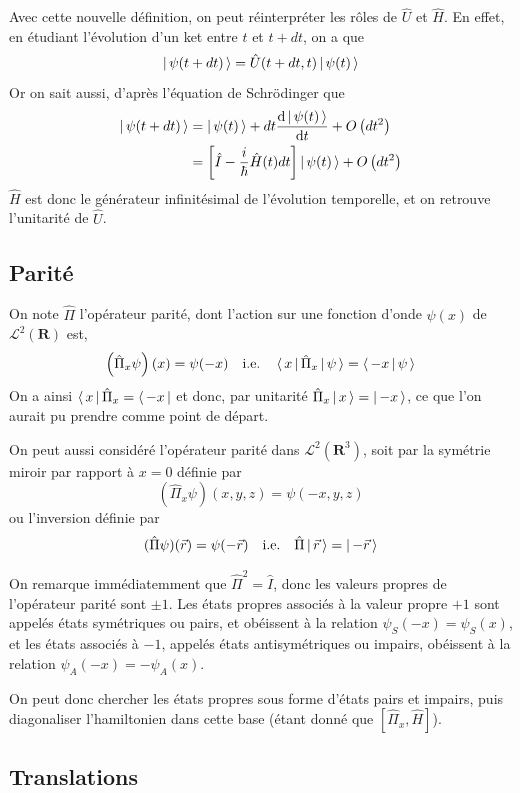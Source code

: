     Avec cette nouvelle définition, on peut réinterpréter les rôles de $\hat{U}$ et $\hat{H}$. En effet, en étudiant l’évolution d’un ket entre $t$ et $t + dt$, on a que 
    \[ \left| \, \psi(t + dt) \, \right> = \hat{U}(t + dt, t) \left| \, \psi(t) \, \right> \]   
    Or on sait aussi, d’après l’équation de Schrödinger que 
    \begin{align*}
        \left| \, \psi(t + dt) \, \right>
        &= \left| \, \psi(t) \, \right> + dt \frac{\text{d}\left| \, \psi(t) \, \right> }{\text{d}t}  + O\left(dt^2\right) \\
        &= \left[\hat{I} - \frac{i}{\hbar} \hat{H}(t) dt\right] \left| \, \psi(t) \, \right> + O\left(dt^2\right)
    \end{align*} 
    $\hat{H}$ est donc le générateur infinitésimal de l’évolution temporelle, et on retrouve l’unitarité de $\hat{U}$.

    \subsection{Parité}

    On note $\hat{\Pi}$ l’opérateur parité, dont l’action sur une fonction d’onde $\psi(x)$ de $\mathcal{L}^2(\mathbf{R})$ est,
    \[ \left(\hat{\Pi}_x\psi\right)(x) = \psi(-x) \quad \text{i.e.} \quad \left< \, x \, \right| \hat{\Pi}_x \left| \, \psi \, \right> = \left< \, -x \, \middle| \, \psi \, \right> \]
    On a ainsi $\left< \, x \, \right| \hat{\Pi}_x = \left< \, -x \, \right|$ et donc, par unitarité $\hat{\Pi}_x \left| \, x \, \right> = \left| \, -x \, \right>$, ce que l’on aurait pu prendre comme point de départ.

    On peut aussi considéré l’opérateur parité dans $\mathcal{L}^2(\mathbf{R}^3)$, soit par la symétrie miroir par rapport à $x = 0$ définie par 
    \[ (\hat{\Pi}_x\psi)(x,y,z) = \psi(-x,y,z) \]    
    ou l’inversion définie par 
    \[ (\hat{\Pi}\psi)(\vec{r}) = \psi(-\vec{r}) \quad \text{i.e.} \quad \hat{\Pi}\left| \, \vec{r} \, \right> = \left| \, -\vec{r} \, \right> \] 

    On remarque immédiatemment que $\hat{\Pi}^2 = \hat{I}$, donc les valeurs propres de l’opérateur parité sont $\pm 1$. Les états propres associés à la valeur propre $+1$ sont appelés états symétriques ou pairs, et obéissent à la relation $\psi_S(-x) = \psi_S(x)$, et les états associés à $-1$, appelés états antisymétriques ou impairs, obéissent à la relation $\psi_A(-x) = - \psi_A(x)$.

    On peut donc chercher les états propres sous forme d’états pairs et impairs, puis diagonaliser l’hamiltonien dans cette base (étant donné que $\left[\hat{\Pi}_x, \hat{H}\right]$).

    \subsection{Translations}

